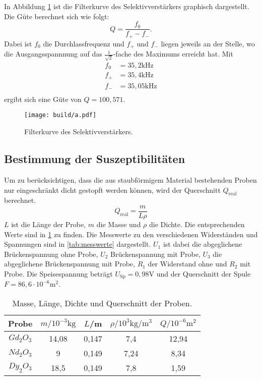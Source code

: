 In Abbildung \ref{fig:verst} ist die Filterkurve des Selektivverstärkers graphisch dargestellt. Die Güte berechnet sich wie folgt:
\begin{equation}
  Q=\frac{f_0}{f_+ - f_-}.
\end{equation}
Dabei ist $f_0$ die Durchlassfrequenz und $f_+$ und $f_-$ liegen jeweils an der Stelle, wo die Ausgangsspannnung auf das $\frac{1}{\sqrt{2}}$-fache des Maximums erreicht hat.
Mit
\begin{align}
  f_0 &= 35,2 \si{\kilo\Hz}\\
  f_+ &= 35,4 \si{\kilo\Hz}\\
  f_- &= 35,05 \si{\kilo\Hz}\\
\end{align}
ergibt sich eine Güte von $Q=100,571$.

\begin{figure}
  \centering
  \texttt{[image: build/a.pdf]}
\caption{Filterkurve des Selektivverstärkers.}
  \label{fig:verst}
\end{figure}

\subsection{Bestimmung der Suszeptibilitäten}
Um zu berücksichtigen, dass die aus staubförmigem Material bestehenden Proben nur eingeschränkt dicht gestopft werden können, wird der Querschnitt $Q_\mathrm{real}$ berechnet.
\begin{equation}
  Q_\mathrm{real}=\frac{m}{L \rho}
\end{equation}
$L$ ist die Länge der Probe, $m$ die Masse und $\rho$ die Dichte.
Die entsprechenden Werte sind in \ref{tab:daten} zu finden. Die Messwerte zu den verschiedenen Widerständen und Spannungen sind in \ref{tab:messwerte} dargestellt. $U_1$ ist dabei die abgeglichene Brückenspannung ohne Probe, $U_2$ Brückenspannung mit Probe, $U_3$ die abgeglichene Brückenspannung mit Probe, $R_1$ der Widerstand ohne und $R_2$ mit Probe. Die Speisespannung beträgt $U_\mathrm{Sp}=0,98 \si{\volt}$ und der Querschnitt der Spule $F=86,6 \cdot 10^{-6} \si{\meter}^2$.

\begin{table}
  \caption{Masse, Länge, Dichte und Querschnitt der Proben.}
  \centering
  \label{tab:daten}
  \begin{tabular}{c c c c c}
    \toprule
    Probe &  $m /10^{-3}\si{\kilo\gram}$ & $L$/\si{\meter} & $\rho/10^3 \si{\kilo\gram}/\si{\meter}^3$ & $Q/10^{-6}\si{\meter}^2$\\
    \midrule
    $Gd_2 O_3$ & 14,08 & 0,147 & 7,4 & 12,94 \\
    $Nd_2 O_3$ & 9 & 0,149 & 7,24 & 8,34 \\
    $Dy_2 O_3$ & 18,5 & 0,149 & 7,8 & 1,59 \\
    \bottomrule
    \end{tabular}
  \end{table}

